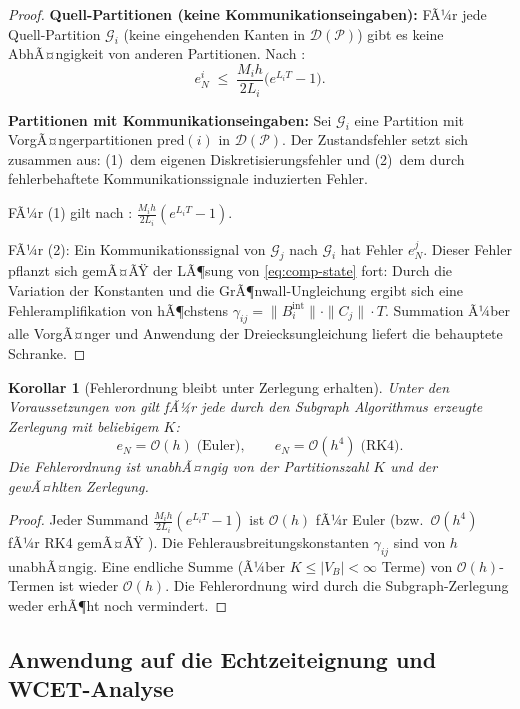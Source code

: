 ﻿\documentclass[12pt,a4paper]{article}
\newtheorem{korollar}[theorem]{Korollar}
\theoremstyle{definition}
\begin{document}
\begin{proof}
\textbf{Quell-Partitionen (keine Kommunikationseingaben):}
FÃ¼r jede Quell-Parti\-tion $\mathcal{G}_i$ (keine eingehenden Kanten in
$\mathcal{D}(\mathcal{P})$) gibt es keine AbhÃ¤ngigkeit von anderen
Partitionen. Nach :
\[
  e_N^i \;\leq\; \frac{M_i h}{2 L_i}\bigl(e^{L_i T} - 1\bigr).
\]

\textbf{Partitionen mit Kommunikationseingaben:}
Sei $\mathcal{G}_i$ eine Partition mit VorgÃ¤ngerpartitionen
$\mathrm{pred}(i)$ in $\mathcal{D}(\mathcal{P})$. Der Zustandsfehler
setzt sich zusammen aus:
(1)~dem eigenen Diskretisierungsfehler und
(2)~dem durch fehlerbehaftete Kommunikationssignale induzierten Fehler.

FÃ¼r (1) gilt nach :
$\frac{M_i h}{2L_i}(e^{L_i T} - 1)$.

FÃ¼r (2): Ein Kommunikationssignal von $\mathcal{G}_j$ nach $\mathcal{G}_i$
hat Fehler $e_N^j$. Dieser Fehler pflanzt sich gemÃ¤ÃŸ der LÃ¶sung von
\eqref{eq:comp-state} fort: Durch die Variation der Konstanten und die
GrÃ¶nwall-Ungleichung ergibt sich eine Fehleramplifikation von hÃ¶chstens
$\gamma_{ij} = \|B_i^{\mathrm{int}}\| \cdot \|C_j\| \cdot T$.
Summation Ã¼ber alle VorgÃ¤nger und Anwendung der Dreiecksungleichung
liefert die behauptete Schranke.
\end{proof}

\begin{korollar}[Fehlerordnung bleibt unter Zerlegung erhalten]
\label{kor:subgraph-error-order}
Unter den Voraussetzungen von  gilt fÃ¼r jede
durch den Subgraph Algorithmus erzeugte Zerlegung mit beliebigem $K$:
\[
  e_N = \mathcal{O}(h)  \;\text{(Euler)},\qquad
  e_N = \mathcal{O}(h^4)\;\text{(RK4)}.
\]
Die Fehlerordnung ist unabhÃ¤ngig von der Partitionszahl $K$ und der
gewÃ¤hlten Zerlegung.
\end{korollar}

\begin{proof}
Jeder Summand $\frac{M_i h}{2L_i}(e^{L_i T}-1)$ ist $\mathcal{O}(h)$
fÃ¼r Euler (bzw.\ $\mathcal{O}(h^4)$ fÃ¼r RK4 gemÃ¤ÃŸ ).
Die Fehlerausbreitungskonstanten $\gamma_{ij}$ sind von $h$ unabhÃ¤ngig.
Eine endliche Summe (Ã¼ber $K \leq |V_B| < \infty$ Terme) von
$\mathcal{O}(h)$-Termen ist wieder $\mathcal{O}(h)$. Die Fehlerordnung
wird durch die Subgraph-Zerlegung weder erhÃ¶ht noch vermindert.
\end{proof}

\subsection{Anwendung auf die Echtzeiteignung und WCET-Analyse}
\label{subsec:subgraph-wcet}
\end{document}
